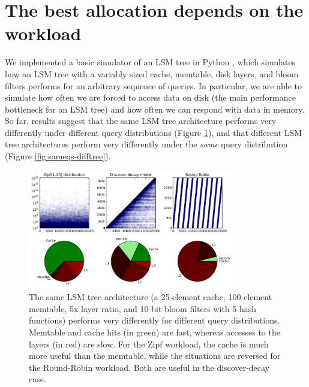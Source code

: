 \documentclass{sig-alternate-05-2015}
\begin{document}

\section{The best allocation depends on the workload}

We implemented a basic simulator of an LSM tree in Python \cite{lsmulator},
which simulates how an LSM tree with a variably sized cache, memtable, disk
layers, and bloom filters performs for an arbitrary sequence of queries. In
particular, we are able to simulate how often we are forced to access data on
disk (the main performance bottleneck for an LSM tree) and how often we can
respond with data in memory. So far, results suggest that the same LSM tree
architecture performs very differently under different query distributions
(Figure \ref{fig:sametree-diffqs}), and that different LSM tree architectures
perform very differently under the \textit{same} query distribution (Figure
\ref{fig:sameqs-difftree}). 

\begin{figure}[!htb]
\begin{center}
\includegraphics[width=9cm]{sametree-diffqs.png}
\end{center}
\caption{The same LSM tree architecture (a 25-element cache, 100-element
memtable, 5x layer ratio, and 10-bit bloom filters with 5 hash functions)
performs very differently for different query distributions. Memtable and cache
hits (in green) are fast, whereas accesses to the layers (in red) are slow. For
the Zipf workload, the cache is much more useful than the memtable, while the
situations are reversed for the Round-Robin workload. Both are useful in the
discover-decay case.}
\label{fig:sametree-diffqs}
\end{figure}
\end{document}
